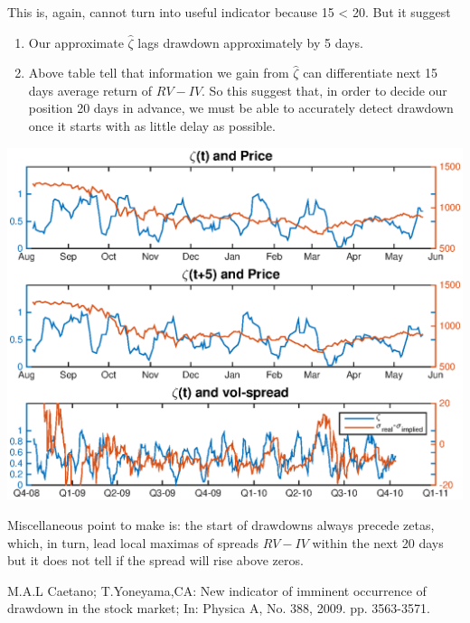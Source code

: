 \documentclass[a4paper]{article}
\begin{document}
This is, again, cannot turn into useful indicator because 15 < 20. But it suggest

\begin{enumerate}
  \item Our approximate $\hat{\zeta}$ lags drawdown approximately by 5 days. 
  \item Above table tell that information we gain from $\hat{\zeta}$ can differentiate next 15 days average return of $RV-IV$. So this suggest that, in order to decide our position 20 days in advance, we must be able to accurately detect drawdown once it starts with as little delay as possible.
\end{enumerate}

\includegraphics[width=\textwidth]{linkdrawdownspread.eps}

Miscellaneous point to make is: the start of drawdowns always precede zetas, which, in turn, lead local maximas of spreads $RV-IV$ within the next 20 days but it does not tell if the spread will rise above zeros.


\begin{thebibliography}{1}
 M.A.L Caetano; T.Yoneyama,CA: New indicator of imminent occurrence of drawdown in the stock market; In: Physica A, No. 388, 2009. pp. 3563-3571.
\end{thebibliography}
\end{document}
